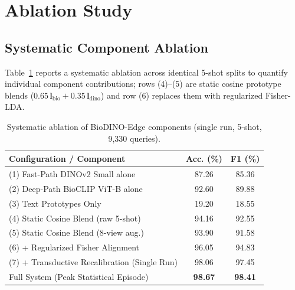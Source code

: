 \documentclass[preprint,12pt]{elsarticle}
\begin{document}
\section{Ablation Study}
\label{sec:ablation_study}

\subsection{Systematic Component Ablation}
\label{sec:ablation}
Table~\ref{tab:ablation} reports a systematic ablation across identical 5-shot splits to quantify individual component contributions; rows (4)--(5) are static cosine prototype blends ($0.65\,\mathbf{l}_{\text{bio}}+0.35\,\mathbf{l}_{\text{dino}}$) and row (6) replaces them with regularized Fisher-LDA.

\begin{table}[htbp]
\caption{Systematic ablation of BioDINO-Edge components (single run, 5-shot, 9,330 queries).}
\label{tab:ablation}
\centering

\footnotesize
\setlength{\tabcolsep}{3pt}
\begin{tabular*}{\columnwidth}{@{\extracolsep{\fill}}lcc}
\toprule
\textbf{Configuration / Component} & \textbf{Acc. (\%)} & \textbf{F1 (\%)} \\
\midrule
(1) Fast-Path DINOv2 Small alone & 87.26 & 85.36 \\
(2) Deep-Path BioCLIP ViT-B alone & 92.60 & 89.88 \\
(3) Text Prototypes Only & 19.20 & 18.55 \\
(4) Static Cosine Blend (raw 5-shot) & 94.16 & 92.55 \\
(5) Static Cosine Blend (8-view aug.) & 93.90 & 91.58 \\
(6) + Regularized Fisher Alignment & 96.05 & 94.83 \\
(7) + Transductive Recalibration (Single Run) & 98.06 & 97.45 \\
\midrule
Full System (Peak Statistical Episode) & \textbf{98.67} & \textbf{98.41} \\
\bottomrule
\end{tabular*}
\end{table}
\end{document}

